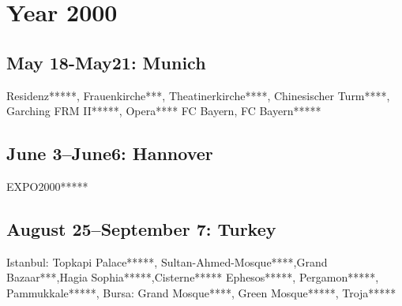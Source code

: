 \chapter{Year 2000}
\label{2000}

\section{May 18-May21: Munich}
\label{2000:Munich}

Residenz*****, Frauenkirche***, Theatinerkirche****, Chinesischer Turm****, Garching FRM II*****, Opera****
FC Bayern, FC Bayern*****

\section{June 3--June6: Hannover}
\label{2000:Hannover}

EXPO2000*****

\section{August 25--September 7: Turkey}
\label{2000:Turkey}


Istanbul: Topkapi Palace*****, Sultan-Ahmed-Mosque****,Grand Bazaar***,Hagia Sophia*****,Cisterne*****
Ephesos*****, Pergamon*****, Pammukkale*****, Bursa: Grand Mosque****, Green Mosque*****, Troja*****